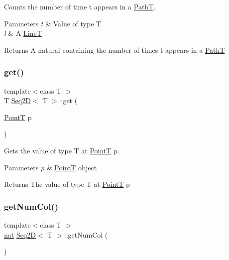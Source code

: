 Counts the number of time t appears in a \mbox{\hyperlink{class_path_t}{PathT}}. 


\begin{DoxyParams}{Parameters}
{\em t} & Value of type T \\
\hline
{\em l} & A \mbox{\hyperlink{class_line_t}{LineT}} \\
\hline
\end{DoxyParams}
\begin{DoxyReturn}{Returns}
A natural containing the number of times t appears in a \mbox{\hyperlink{class_path_t}{PathT}} 
\end{DoxyReturn}
\mbox{\label{class_seq2_d_af4f1cf4ccf0e0d6bcba5a52f984877cc}} 
\subsubsection{\texorpdfstring{get()}{get()}}
{\footnotesize\ttfamily template$<$class T $>$ \\
T \mbox{\hyperlink{class_seq2_d}{Seq2D}}$<$ T $>$\+::get (\begin{DoxyParamCaption}\item[{\mbox{\hyperlink{class_point_t}{PointT}}}]{p }\end{DoxyParamCaption})}



Gets the value of type T at \mbox{\hyperlink{class_point_t}{PointT}} p. 


\begin{DoxyParams}{Parameters}
{\em p} & \mbox{\hyperlink{class_point_t}{PointT}} object \\
\hline
\end{DoxyParams}
\begin{DoxyReturn}{Returns}
The value of type T at \mbox{\hyperlink{class_point_t}{PointT}} p 
\end{DoxyReturn}
\mbox{\label{class_seq2_d_a4a38e61808f6c856bd46a47a0fbb183f}} 
\subsubsection{\texorpdfstring{get\+Num\+Col()}{getNumCol()}}
{\footnotesize\ttfamily template$<$class T $>$ \\
\mbox{\hyperlink{_path_a_d_t_8h_a56638ee9d162e8cce3a15f92d2023d6e}{nat}} \mbox{\hyperlink{class_seq2_d}{Seq2D}}$<$ T $>$\+::get\+Num\+Col (\begin{DoxyParamCaption}{ }\end{DoxyParamCaption})}



